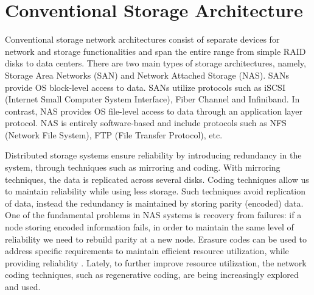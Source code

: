 \section{Conventional Storage Architecture}
\indent 
Conventional storage network architectures consist of separate devices for network and storage functionalities and span the entire range from simple RAID disks to data centers. There are two main types of storage architectures, namely, Storage Area Networks (SAN) and Network Attached Storage (NAS). SANs provide OS block-level access to data. SANs utilize protocols such as iSCSI (Internet Small Computer System Interface), Fiber Channel and Infiniband. In contrast, NAS provides OS file-level access to data through an  application layer protocol. NAS is entirely software-based and include protocols such as NFS (Network File System), FTP (File Transfer Protocol), etc.%

Distributed storage systems ensure reliability by introducing redundancy in the system, through techniques such as mirroring and coding. With mirroring techniques, the data is replicated across several disks. Coding techniques allow us to maintain reliability while using less storage. Such techniques avoid replication of data, instead the redundancy is maintained by storing parity (encoded) data. One of the fundamental problems in NAS systems is recovery from failures: if a node storing encoded information fails, in order to maintain the same level of reliability we need to rebuild parity at a new node. Erasure codes can be used to address specific requirements to maintain efficient resource utilization, while providing reliability \cite{dimakis2011survey}. Lately, to further improve resource utilization, the network coding techniques, such as regenerative coding, are being increasingly explored and used. 





